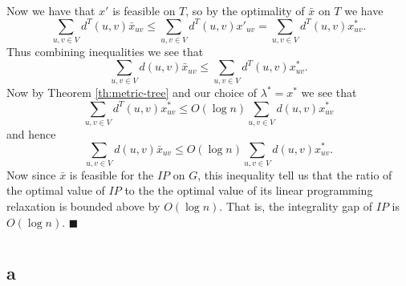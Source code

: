 \documentclass[letterpaper,12pt,oneside,onecolumn]{article}
\begin{document}
\paragraph{}
Now we have that $x'$ is feasible on $T$, so by the optimality of $\bar{x}$ on $T$ we have
$$\sum_{u,v \in V} d^T(u,v) \bar{x}_{uv} \leq \sum_{u,v \in V} d^T(u,v) x'_{uv} = \sum_{u,v \in V} d^T(u,v) x^*_{uv}.$$
Thus combining inequalities we see that
$$\sum_{u,v \in V} d(u,v) \bar{x}_{uv} \leq \sum_{u,v \in V} d^T(u,v) x^*_{uv}.$$
Now by Theorem \ref{th:metric-tree} and our choice of $\lambda^* =x^*$ we see that 
$$\sum_{u,v \in V} d^T(u,v) x^*_{uv} \leq O(\log n) \sum_{u,v \in V} d(u,v) x^*_{uv}$$
and hence
$$\sum_{u,v \in V} d(u,v) \bar{x}_{uv} \leq O(\log n) \sum_{u,v \in V} d(u,v) x^*_{uv}.$$
Now since $\bar{x}$ is feasible for the $IP$ on $G$, this inequality tell us that the ratio of the optimal value of $IP$ to the the optimal value of its linear programming relaxation is bounded above by $O(\log n)$. That is, the integrality gap of $IP$ is $O(\log n)$. $\blacksquare$

\section{}
\subsection{a}
\end{document}
